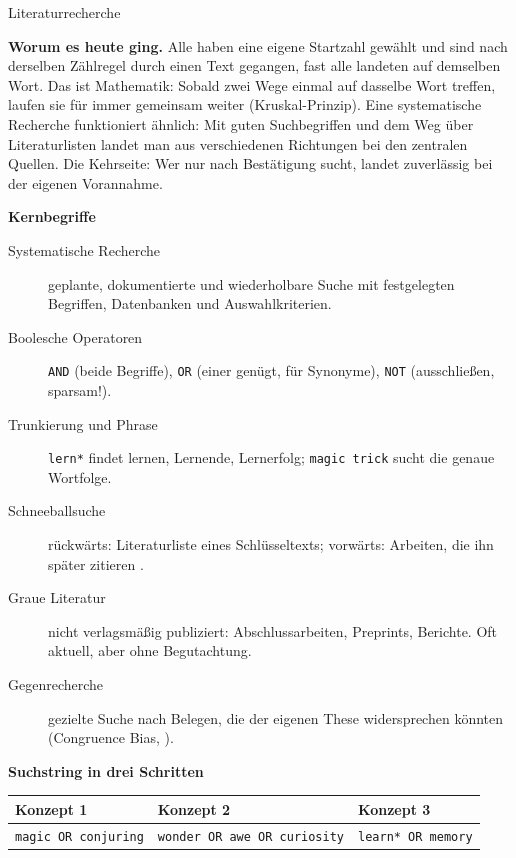 \begin{handout}{Literaturrecherche}

\textbf{Worum es heute ging.} Alle haben eine eigene Startzahl gewählt und
sind nach derselben Zählregel durch einen Text gegangen, fast alle landeten
auf demselben Wort. Das ist Mathematik: Sobald zwei Wege einmal auf
dasselbe Wort treffen, laufen sie für immer gemeinsam weiter (Kruskal-Prinzip).
Eine systematische Recherche funktioniert ähnlich: Mit guten Suchbegriffen und
dem Weg über Literaturlisten landet man aus verschiedenen Richtungen bei den
zentralen Quellen. Die Kehrseite: Wer nur nach Bestätigung sucht, landet
zuverlässig bei der eigenen Vorannahme.

\textbf{Kernbegriffe}
\begin{description}
  \item[Systematische Recherche] geplante, dokumentierte und wiederholbare
    Suche mit festgelegten Begriffen, Datenbanken und Auswahlkriterien.
  \item[Boolesche Operatoren] \texttt{AND} (beide Begriffe), \texttt{OR}
    (einer genügt, für Synonyme), \texttt{NOT} (ausschließen, sparsam!).
  \item[Trunkierung und Phrase] \texttt{lern*} findet lernen, Lernende,
    Lernerfolg; \texttt{magic trick} sucht die genaue Wortfolge.
  \item[Schneeballsuche] rückwärts: Literaturliste eines Schlüsseltexts;
    vorwärts: Arbeiten, die ihn später zitieren \parencite{wohlin2014snowballing}.
  \item[Graue Literatur] nicht verlagsmäßig publiziert: Abschlussarbeiten,
    Preprints, Berichte. Oft aktuell, aber ohne Begutachtung.
  \item[Gegenrecherche] gezielte Suche nach Belegen, die der eigenen These
    widersprechen könnten (Congruence Bias, \textcite{wason1960failure}).
\end{description}

\textbf{Suchstring in drei Schritten}
\begin{center}
\small
\begin{tabular}{lll}
\toprule
\textbf{Konzept 1} & \textbf{Konzept 2} & \textbf{Konzept 3} \\
\midrule
\texttt{magic OR conjuring} & \texttt{wonder OR awe OR curiosity} & \texttt{learn* OR memory} \\
\bottomrule
\end{tabular}


\end{center}
\end{handout}
